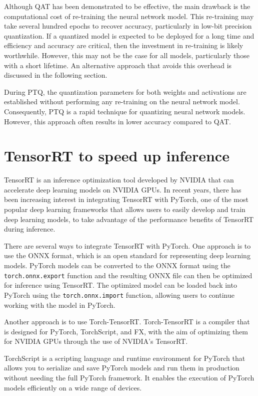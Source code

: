 Although QAT has been demonstrated to be effective, the main drawback is the computational cost of re-training the neural network model. This re-training may take several hundred epochs to recover accuracy, particularly in low-bit precision quantization. If a quantized model is expected to be deployed for a long time and efficiency and accuracy are critical, then the investment in re-training is likely worthwhile. However, this may not be the case for all models, particularly those with a short lifetime. An alternative approach that avoids this overhead is discussed in the following section.

During PTQ, the quantization parameters for both weights and activations are established without performing any re-training on the neural network model. Consequently, PTQ is a rapid technique for quantizing neural network models. However, this approach often results in lower accuracy compared to QAT.

\section{TensorRT to speed up inference}
\label{sec:tensorrt}

TensorRT is an inference optimization tool developed by NVIDIA that can accelerate deep learning models on NVIDIA GPUs. In recent years, there has been increasing interest in integrating TensorRT with PyTorch, one of the most popular deep learning frameworks that allows users to easily develop and train deep learning models, to take advantage of the performance benefits of TensorRT during inference.
 
There are several ways to integrate TensorRT with PyTorch. One approach is to use the ONNX format, which is an open standard for representing deep learning models. PyTorch models can be converted to the ONNX format using the \texttt{torch.onnx.export} function and the resulting ONNX file can then be optimized for inference using TensorRT. The optimized model can be loaded back into PyTorch using the \texttt{torch.onnx.import} function, allowing users to continue working with the model in PyTorch.

Another approach is to use Torch-TensorRT. Torch-TensorRT is a compiler that is designed for PyTorch, TorchScript, and FX, with the aim of optimizing them for NVIDIA GPUs through the use of NVIDIA's TensorRT.

TorchScript is a scripting language and runtime environment for PyTorch that allows you to serialize and save PyTorch models and run them in production without needing the full PyTorch framework. It enables the execution of PyTorch models efficiently on a wide range of devices.

